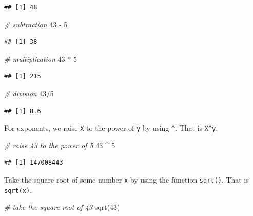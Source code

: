 \documentclass[
]{book}
\newenvironment{Shaded}{\begin{snugshade}}{\end{snugshade}}
\newcommand{\CommentTok}[1]{\textcolor[rgb]{0.56,0.35,0.01}{\textit{#1}}}
\newcommand{\DecValTok}[1]{\textcolor[rgb]{0.00,0.00,0.81}{#1}}
\newcommand{\FunctionTok}[1]{\textcolor[rgb]{0.00,0.00,0.00}{#1}}
\newcommand{\NormalTok}[1]{#1}
\newcommand{\SpecialCharTok}[1]{\textcolor[rgb]{0.00,0.00,0.00}{#1}}
\begin{document}
\begin{verbatim}
## [1] 48
\end{verbatim}

\begin{Shaded}
\begin{Highlighting}[]
\CommentTok{\# subtraction}
\DecValTok{43} \SpecialCharTok{{-}} \DecValTok{5}
\end{Highlighting}
\end{Shaded}

\begin{verbatim}
## [1] 38
\end{verbatim}

\begin{Shaded}
\begin{Highlighting}[]
\CommentTok{\# multiplication}
\DecValTok{43} \SpecialCharTok{*} \DecValTok{5}
\end{Highlighting}
\end{Shaded}

\begin{verbatim}
## [1] 215
\end{verbatim}

\begin{Shaded}
\begin{Highlighting}[]
\CommentTok{\# division}
\DecValTok{43}\SpecialCharTok{/}\DecValTok{5}
\end{Highlighting}
\end{Shaded}

\begin{verbatim}
## [1] 8.6
\end{verbatim}

For exponents, we raise \texttt{X} to the power of \texttt{y} by using \texttt{\^{}}. That is \texttt{X\^{}y}.

\begin{Shaded}
\begin{Highlighting}[]
\CommentTok{\# raise 43 to the power of 5}
\DecValTok{43} \SpecialCharTok{\^{}} \DecValTok{5}
\end{Highlighting}
\end{Shaded}

\begin{verbatim}
## [1] 147008443
\end{verbatim}

Take the square root of some number \texttt{x} by using the function \texttt{sqrt()}. That is \texttt{sqrt(x)}.

\begin{Shaded}
\begin{Highlighting}[]
\CommentTok{\# take the square root of 43}
\FunctionTok{sqrt}\NormalTok{(}\DecValTok{43}\NormalTok{)}
\end{Highlighting}
\end{Shaded}
\end{document}
